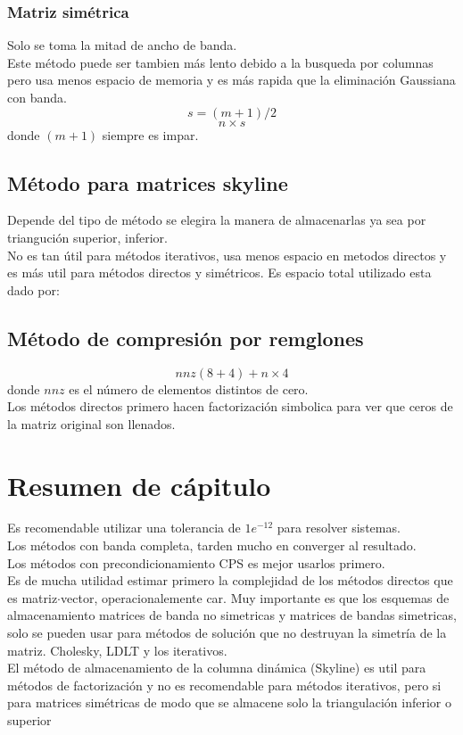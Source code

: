 \subsubsection{Matriz sim\'etrica}
Solo se toma la mitad de ancho de banda.\\
Este m\'etodo puede ser tambien m\'as lento debido a la busqueda por columnas pero usa menos espacio de memoria y es m\'as rapida que la eliminaci\'on Gaussiana con banda.
\begin{displaymath}
s=(m+1)/2
\end{displaymath}
\begin{displaymath}
n \times s
\end{displaymath}
donde $(m+1)$ siempre es impar.
\subsection{M\'etodo para matrices skyline}
Depende del tipo de m\'etodo se elegira la manera de almacenarlas ya sea por trianguci\'on superior, inferior.\\
No es tan \'util para m\'etodos iterativos, usa menos espacio en metodos directos y es m\'as util para m\'etodos directos y sim\'etricos. Es espacio total utilizado esta dado por:
\subsection{M\'etodo de compresi\'on por remglones}
\begin{displaymath}
nnz(8+4)+n\times 4
\end{displaymath} 
donde $nnz$ es el n\'umero de elementos distintos de cero.\\
Los m\'etodos directos primero hacen factorizaci\'on simbolica para ver que ceros de la matriz original son llenados.

\section{Resumen de cápitulo}
Es recomendable utilizar una tolerancia de $1e^{-12}$ para resolver sistemas.\\
Los m\'etodos con banda completa, tarden mucho en converger al resultado.\\
Los m\'etodos con precondicionamiento CPS es mejor usarlos primero.\\
Es de mucha utilidad estimar primero la complejidad de los m\'etodos directos que es matriz$\cdot$vector, operacionalemente car. 
Muy importante es que los esquemas de almacenamiento matrices de banda no simetricas y matrices de bandas simetricas, solo se pueden usar para m\'etodos de soluci\'on que no destruyan la simetr\'ia de la matriz. Cholesky, LDLT y los iterativos.\\
El m\'etodo de almacenamiento de la columna din\'amica (Skyline) es util para m\'etodos de factorizaci\'on y no es recomendable para m\'etodos iterativos, pero si para matrices sim\'etricas de modo que se almacene solo la triangulaci\'on inferior o superior 